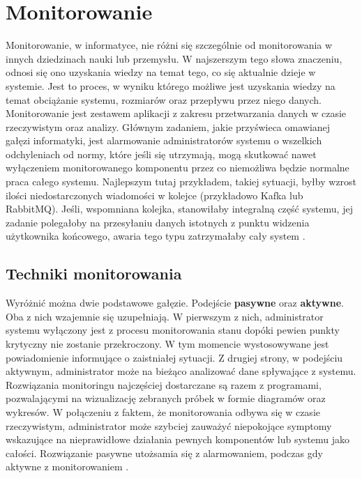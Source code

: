 \section{Monitorowanie}
    Monitorowanie, w informatyce, nie różni się szczególnie od monitorowania w innych dziedzinach nauki lub przemysłu. 
    W najszerszym tego słowa znaczeniu, odnosi się ono uzyskania wiedzy na temat tego, co się aktualnie dzieje w systemie.
    Jest to proces, w wyniku którego możliwe jest uzyskania wiedzy na temat obciążanie systemu, rozmiarów oraz przepływu przez niego
    danych. Monitorowanie jest zestawem aplikacji z zakresu przetwarzania danych w czasie rzeczywistym oraz analizy. 
    Głównym zadaniem, jakie przyświeca omawianej gałęzi informatyki, jest alarmowanie administratorów systemu o wszelkich
    odchyleniach od normy, które jeśli się utrzymają, mogą skutkować nawet wyłączeniem monitorowanego
    komponentu przez co niemożliwa będzie normalne praca całego systemu. Najlepszym tutaj przykładem, takiej sytuacji, 
    byłby wzrost ilości niedostarczonych wiadomości w kolejce (przykładowo Kafka lub RabbitMQ). Jeśli, wspomniana kolejka,
    stanowiłaby integralną część systemu, jej zadanie polegałoby na przesyłaniu danych istotnych z punktu
    widzenia użytkownika końcowego, awaria tego typu zatrzymałaby cały system \cite{monitoring_and_alerting}.
    
    \subsection{Techniki monitorowania}
    Wyróżnić można dwie podstawowe gałęzie. Podejście \textbf{pasywne} oraz \textbf{aktywne}. Oba z nich wzajemnie się uzupełniają.
    W pierwszym z nich, administrator systemu wyłączony jest z procesu monitorowania stanu dopóki pewien
    punkty krytyczny nie zostanie przekroczony. W tym momencie wystosowywane jest powiadomienie informujące o zaistniałej
    sytuacji. Z drugiej strony, w podejściu aktywnym, administrator może na bieżąco analizować dane spływające z systemu.
    Rozwiązania monitoringu najczęściej dostarczane są razem z programami, pozwalającymi na
    wizualizację zebranych próbek w formie diagramów oraz wykresów. W połączeniu z faktem, że monitorowania odbywa się
    w czasie rzeczywistym, administrator może szybciej zauważyć niepokojące symptomy wskazujące
    na nieprawidłowe działania pewnych komponentów lub systemu jako całości.
    Rozwiązanie pasywne utożsamia się z alarmowaniem, podczas gdy aktywne z monitorowaniem \cite{monitoring_and_alerting}.
    

